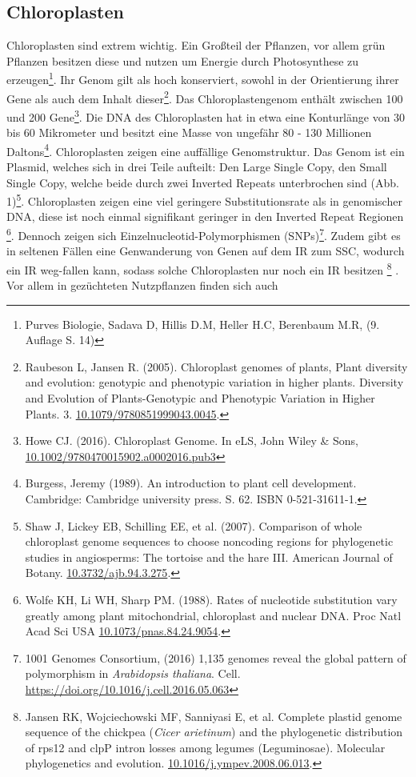 \documentclass{scrartcl}
\begin{document}
\subsection{Chloroplasten}
\label{sec-2-1}
Chloroplasten sind extrem wichtig. Ein Großteil der Pflanzen, vor allem grün Pflanzen besitzen diese und nutzen um Energie durch Photosynthese zu erzeugen\footnote{Purves Biologie, Sadava D, Hillis D.M, Heller H.C, Berenbaum M.R, (9. Auflage S. 14)}.
Ihr Genom gilt als hoch konserviert, sowohl in der Orientierung ihrer Gene als auch dem Inhalt dieser\footnote{Raubeson L, Jansen R. (2005). Chloroplast genomes of plants, Plant diversity and evolution: genotypic and phenotypic variation in higher plants. Diversity and Evolution of Plants-Genotypic and Phenotypic Variation in Higher Plants. 3. \url{10.1079/9780851999043.0045}.}. Das Chloroplastengenom enthält zwischen 100 und 200 Gene\footnote{Howe CJ. (2016). Chloroplast Genome. In eLS, John Wiley \& Sons,  \url{10.1002/9780470015902.a0002016.pub3}}. 
Die DNA des Chloroplasten hat in etwa eine Konturlänge von 30 bis 60 Mikrometer und besitzt eine Masse von ungefähr 80 - 130 Millionen Daltons\footnote{Burgess, Jeremy (1989). An introduction to plant cell development. Cambridge: Cambridge university press. S. 62. ISBN 0-521-31611-1.}.
Chloroplasten zeigen
eine auffällige Genomstruktur. Das Genom ist ein Plasmid, welches sich in drei Teile aufteilt: Den Large Single Copy, den 
Small Single Copy, welche beide durch zwei Inverted Repeats unterbrochen sind (Abb. 1)\footnote{Shaw J, Lickey EB, Schilling EE, et al. (2007). Comparison of whole chloroplast genome sequences to choose noncoding regions for phylogenetic studies in angiosperms: The tortoise and the hare III. American Journal of Botany. \url{10.3732/ajb.94.3.275}.}. Chloroplasten zeigen eine viel geringere Substitutionsrate
als in genomischer DNA, diese ist noch einmal signifikant geringer in den Inverted Repeat Regionen \footnote{Wolfe KH, Li WH, Sharp PM. (1988). Rates of nucleotide substitution vary greatly among plant mitochondrial, chloroplast and nuclear DNA. Proc Natl Acad Sci USA \url{10.1073/pnas.84.24.9054}.}. Dennoch zeigen sich
Einzelnucleotid-Polymorphismen (SNPs)\footnote{1001 Genomes Consortium, (2016) 1,135 genomes reveal the global pattern of polymorphism in \emph{Arabidopsis thaliana}. Cell. \url{https://doi.org/10.1016/j.cell.2016.05.063}}. Zudem gibt es in seltenen Fällen eine Genwanderung von Genen auf dem IR zum SSC, wodurch ein IR weg-fallen kann, 
sodass solche Chloroplasten nur noch ein IR besitzen \footnote{Jansen RK, Wojciechowski MF, Sanniyasi E, et al. Complete plastid genome sequence of the chickpea (\emph{Cicer arietinum}) and the phylogenetic distribution of rps12 and clpP intron losses among legumes (Leguminosae). Molecular phylogenetics and evolution. \url{10.1016/j.ympev.2008.06.013}.} . Vor allem in gezüchteten Nutzpflanzen finden sich auch 
\end{document}
